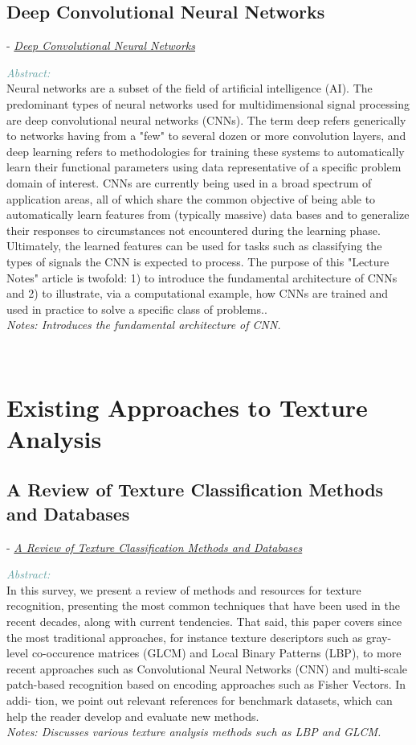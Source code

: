 \documentclass[]{article}
\newcommand{\paperentry}[4]{
            \hangindent=1cm
            \cite{#1} - \href{run:../References/#3}{\textcolor{Sepia}{\textit{#2}}}
            
            \noindent            
            \begin{minipage}[t]{0.1\linewidth}\hfill\end{minipage}
            \begin{minipage}[t]{0.8\linewidth}\textcolor{CadetBlue}{{\textit{Abstract:}}}\\#4\end{minipage}
            \vspace{.25cm}
          }
\begin{document}
\subsection{Deep Convolutional Neural Networks}
          \paperentry{Gonzalez2018cnn}
                     {Deep Convolutional Neural Networks}
                     {Deep Neural Networks/Deep CNN.pdf}
                     {Neural networks are a subset of the field of artificial intelligence (AI). The predominant types of neural networks used for multidimensional signal processing are deep convolutional neural networks (CNNs). The term deep refers generically to networks having from a "few" to several dozen or more convolution layers, and deep learning refers to methodologies for training these systems to automatically learn their functional parameters using data representative of a specific problem domain of interest. CNNs are currently being used in a broad spectrum of application areas, all of which share the common objective of being able to automatically learn features from (typically massive) data bases and to generalize their responses to circumstances not encountered during the learning phase. Ultimately, the learned features can be used for tasks such as classifying the types of signals the CNN is expected to process. The purpose of this "Lecture Notes" article is twofold: 1) to introduce the fundamental architecture of CNNs and 2) to illustrate, via a computational example, how CNNs are trained and used in practice to solve a specific class of problems..
          		     \\\emph{Notes: Introduces the fundamental architecture of CNN.}} \\

 \pagebreak
\section{Existing Approaches to Texture Analysis}
\subsection{A Review of Texture Classification Methods and Databases}
 		\paperentry{Cavalin2017methods}
					{A Review of Texture Classification Methods and Databases}
					{Existing Approaches to Texture Analysis/A Review of Texture Classification Methods and Databases.pdf}
					{In this survey, we present a review of methods and resources for texture recognition, presenting the most common techniques that have been used in the recent decades, along with current tendencies. That said, this paper covers since the most traditional approaches, for instance texture descriptors such as gray-level co-occurence matrices (GLCM) and Local Binary Patterns (LBP), to more recent approaches such as Convolutional Neural Networks (CNN) and multi-scale patch-based recognition based on encoding approaches such as Fisher Vectors. In addi- tion, we point out relevant references for benchmark datasets, which can help the reader develop and evaluate new methods.
					\\\emph{Notes: Discusses various texture analysis methods such as LBP and GLCM.}}\\ 
					
\end{document}
